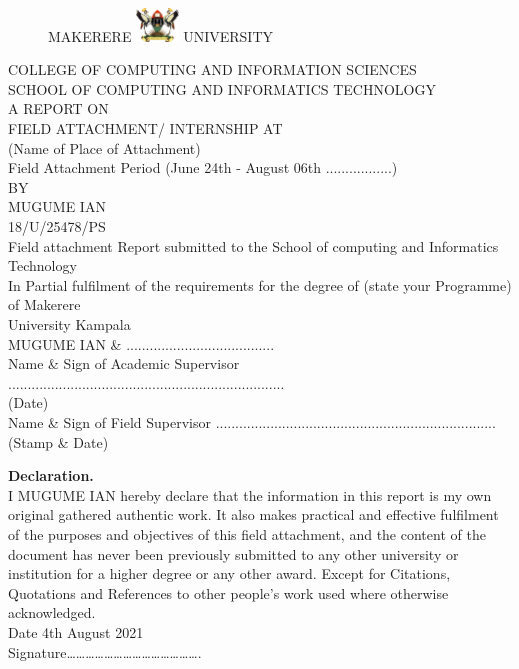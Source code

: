 \documentclass[11pt]{article}
\begin{document}
\begin{titlepage}
\begin{figure}[h]
  \centerline{\small MAKERERE 
  \includegraphics[width=0.1\textwidth]  {muk} UNIVERSITY}
\end{figure}
\begin{center}
	
	COLLEGE OF COMPUTING AND INFORMATION SCIENCES\\
	SCHOOL OF COMPUTING AND INFORMATICS TECHNOLOGY\\
	A REPORT ON\\
	FIELD ATTACHMENT/ INTERNSHIP AT\\
	(Name of Place of Attachment)\\
	Field Attachment Period (June 24th - August 06th .................)\\
	BY\\
	MUGUME IAN\\
	18/U/25478/PS\\
	Field attachment Report submitted to the School of computing and Informatics Technology\\
	In Partial fulfilment of the requirements for the degree of (state your Programme) of Makerere\\
	University Kampala\\
	
	MUGUME IAN \& ......................................\\
	
	
	Name \& Sign of Academic Supervisor .......................................................................\\
	(Date)\\
	Name \& Sign of Field Supervisor ........................................................................\\
	(Stamp \& Date)\\
\end{center}
\end{titlepage}

\newpage
\begin{center}
	\textbf{Declaration.}\\
	 I MUGUME IAN hereby declare that the information in this report is my own original
	 gathered authentic work. It also makes practical and effective fulfilment of the purposes and
	 objectives of this field attachment, and the content of the document has never been previously
	 submitted to any other university or institution for a higher degree or any other award. Except for
	 Citations, Quotations and References to other people’s work used where otherwise acknowledged.\\
	 
	 Date 4th August 2021\\
	 Signature…………………………………….\\
	\thispagestyle{empty}
\end{center}
\end{document}
